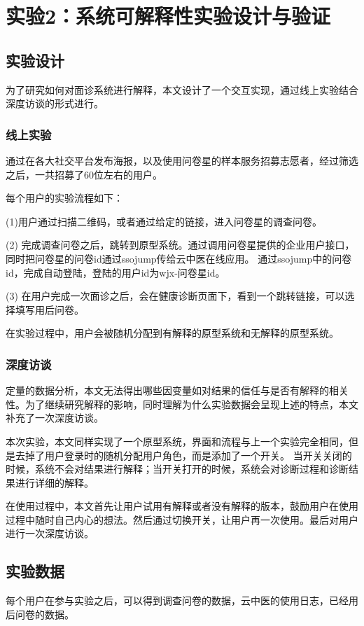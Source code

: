 \section{实验2：系统可解释性实验设计与验证}


\subsection{实验设计}

为了研究如何对面诊系统进行解释，本文设计了一个交互实现，通过线上实验结合深度访谈的形式进行。

\subsubsection{线上实验}
通过在各大社交平台发布海报，以及使用问卷星的样本服务招募志愿者，经过筛选之后，一共招募了60位左右的用户。

每个用户的实验流程如下：

(1)用户通过扫描二维码，或者通过给定的链接，进入问卷星的调查问卷。

(2) 完成调查问卷之后，跳转到原型系统。通过调用问卷星提供的企业用户接口，同时把问卷星的问卷id通过ssojump传给云中医在线应用。
通过ssojump中的问卷id，完成自动登陆，登陆的用户id为wjx-{问卷星id}。

(3) 在用户完成一次面诊之后，会在健康诊断页面下，看到一个跳转链接，可以选择填写用后问卷。

在实验过程中，用户会被随机分配到有解释的原型系统和无解释的原型系统。

\subsubsection{深度访谈}

定量的数据分析，本文无法得出哪些因变量如对结果的信任与是否有解释的相关性。为了继续研究解释的影响，同时理解为什么实验数据会呈现上述的特点，本文补充了一次深度访谈。

本次实验，本文同样实现了一个原型系统，界面和流程与上一个实验完全相同，但是去掉了用户登录时的随机分配用户角色，而是添加了一个开关。
当开关关闭的时候，系统不会对结果进行解释；当开关打开的时候，系统会对诊断过程和诊断结果进行详细的解释。

在使用过程中，本文首先让用户试用有解释或者没有解释的版本，鼓励用户在使用过程中随时自己内心的想法。然后通过切换开关，让用户再一次使用。最后对用户进行一次深度访谈。

\subsection{实验数据}
每个用户在参与实验之后，可以得到调查问卷的数据，云中医的使用日志，已经用后问卷的数据。

